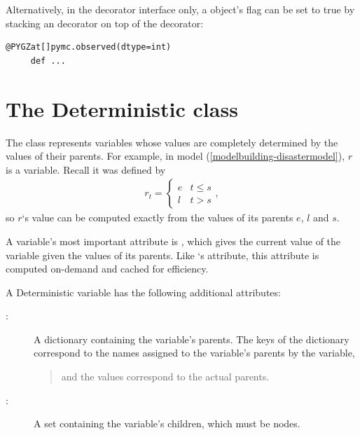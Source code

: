 \documentclass[letterpaper,10pt,english]{sphinxmanual}
\begin{document}
Alternatively, in the decorator interface only, a  object's  flag can be set to true by stacking an  decorator on top of the  decorator:

\begin{Verbatim}[commandchars=@\[\]]
@PYGZat[]pymc.observed(dtype=int)
     def ...
\end{Verbatim}


\section{The Deterministic class}
\label{modelbuilding:deterministic}\label{modelbuilding:the-deterministic-class}
The  class represents variables whose values are completely determined by the values of their parents. For example, in model (\eqref{modelbuilding-disastermodel}), $r$ is a  variable. Recall it was defined by
\begin{eqnarray*}
    r_t=\left\{\begin{array}{ll}
        e & t\le s\\ l & t>s
        \end{array}\right.,
\end{eqnarray*}
so $r$`s value can be computed exactly from the values of its parents $e$, $l$ and $s$.

A  variable's most important attribute is , which gives the current value of the variable given the values of its parents. Like `s  attribute, this attribute is computed on-demand and cached for efficiency.

A Deterministic variable has the following additional attributes:
\begin{description}
\item[{:}] \leavevmode
A dictionary containing the variable's parents. The keys of the dictionary
correspond to the names assigned to the variable's parents by the variable,
\begin{quote}

and the values correspond to the actual parents.
\end{quote}

\item[{:}] \leavevmode
A set containing the variable's children, which must be nodes.

\end{description}
\end{document}
